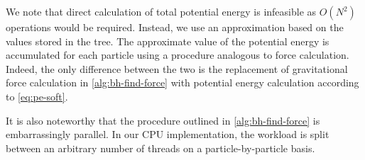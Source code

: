 We note that direct calculation of total potential energy is infeasible as $O(N^2)$ operations would be required.
Instead, we use an approximation based on the values stored in the tree.
The approximate value of the potential energy is accumulated for each particle using a procedure analogous to force calculation.
Indeed, the only difference between the two is the replacement of gravitational force calculation in \autoref{alg:bh-find-force} with potential energy calculation according to \autoref{eq:pe-soft}.

It is also noteworthy that the procedure outlined in \autoref{alg:bh-find-force} is embarrassingly parallel.
In our CPU implementation, the workload is split between an arbitrary number of threads on a particle-by-particle basis.
